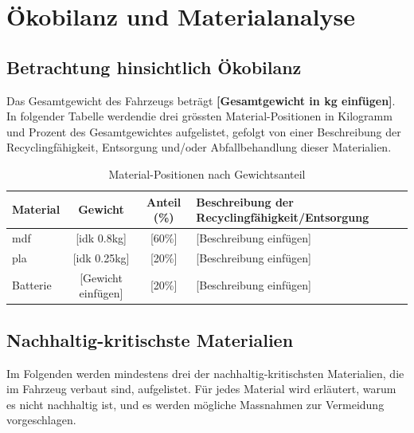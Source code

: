 \section{Ökobilanz und Materialanalyse}

\subsection{Betrachtung hinsichtlich Ökobilanz}
Das Gesamtgewicht des Fahrzeugs beträgt \textbf{[Gesamtgewicht in kg einfügen]}. In folgender Tabelle werdendie drei grössten Material-Positionen in Kilogramm und Prozent des Gesamtgewichtes aufgelistet, gefolgt von einer Beschreibung der Recyclingfähigkeit, Entsorgung und/oder Abfallbehandlung dieser Materialien.

\begin{table}[h]
\centering
\caption{Material-Positionen nach Gewichtsanteil}
\begin{tabular}{l c c p{5cm}}
\toprule
Material & Gewicht  & Anteil (\%) & Beschreibung der Recyclingfähigkeit/Entsorgung \\
\midrule
\acrshort{mdf} & [idk 0.8kg] & [60\%] & [Beschreibung einfügen] \\
\acrshort{pla} & [idk 0.25kg] & [20\%] & [Beschreibung einfügen] \\
Batterie & [Gewicht einfügen] & [20\%] & [Beschreibung einfügen] \\
\bottomrule
\end{tabular}
\end{table}

\subsection{Nachhaltig-kritischste Materialien}
Im Folgenden werden mindestens drei der nachhaltig-kritischsten Materialien, die im Fahrzeug verbaut sind, aufgelistet. Für jedes Material wird erläutert, warum es nicht nachhaltig ist, und es werden mögliche Massnahmen zur Vermeidung vorgeschlagen.


